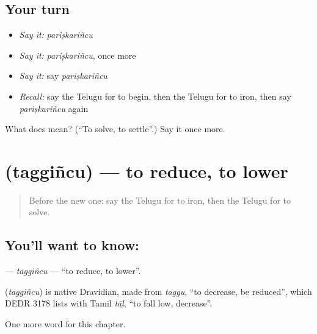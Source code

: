 \subsection*{Your turn}
\begin{itemize}
\raggedright
  \item \emph{Say it:} \emph{pariṣkariñcu}
  \item \emph{Say it:} \emph{pariṣkariñcu}, once more
  \item \emph{Say it:} say \emph{pariṣkariñcu}
  \item \emph{Recall:} say the Telugu for to begin, then the Telugu for to iron, then say \emph{pariṣkariñcu} again
\end{itemize}

\begin{tcolorbox}[breakable,colback=teal!4,colframe=teal!35!black,title={Before you move on}]
What does  mean? (\textquotedblleft{}To solve, to settle\textquotedblright{}.) Say it once more.
\end{tcolorbox}
\section[\texorpdfstring{\te{తగ్గించు} (taggiñcu)}{తగ్గించు (taggiñcu)}]{ (taggiñcu) — to reduce, to lower}

\label{lesson:TE-C243-taggincu}



\begin{quote}
Before the new one: say the Telugu for to iron, then the Telugu for to solve.
\end{quote}

\subsection*{You'll want to know: }
\textbf{} — \emph{taggiñcu} — \textquotedblleft{}to reduce, to lower\textquotedblright{}.

\begin{cousinweb}
\textbf{} (\emph{taggiñcu}) is native Dravidian, made from \emph{taggu}, \textquotedblleft{}to decrease, be reduced\textquotedblright{}, which DEDR 3178 lists with Tamil \emph{tāḻ}, \textquotedblleft{}to fall low, decrease\textquotedblright{}.
\end{cousinweb}

\begin{grammarlens}[title={What you've built}]
One more word for this chapter.
\end{grammarlens}

